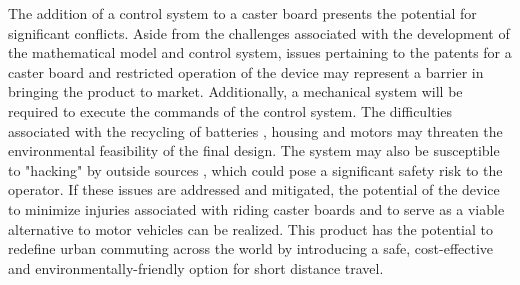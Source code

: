 \documentclass[12pt,letterpaper]{article}
\begin{document}
The addition of a control system to a caster board presents the potential for significant conflicts. 
Aside from the challenges associated with the development of the mathematical model and control system, issues pertaining to the patents for a caster board \cite{casterboardPatent} and restricted operation of the device \cite{TOLaws} may represent a barrier in bringing the product to market. 
Additionally, a mechanical system will be required to execute the commands of the control system. 
The difficulties associated with the recycling of batteries \cite{BatteryRecharge}, housing \cite{PlasticAssessment} and motors may threaten the environmental feasibility of the final design. 
The system may also be susceptible to "hacking" by outside sources \cite{DEFCON}, which could pose a significant safety risk to the operator. 
If these issues are addressed and mitigated, the potential of the device to minimize injuries associated with riding caster boards and to serve as a viable alternative to motor vehicles can be realized. 
This product has the potential to redefine urban commuting across the world by introducing a safe, cost-effective and environmentally-friendly option for short distance travel. 



\newpage
{}

\end{document}
